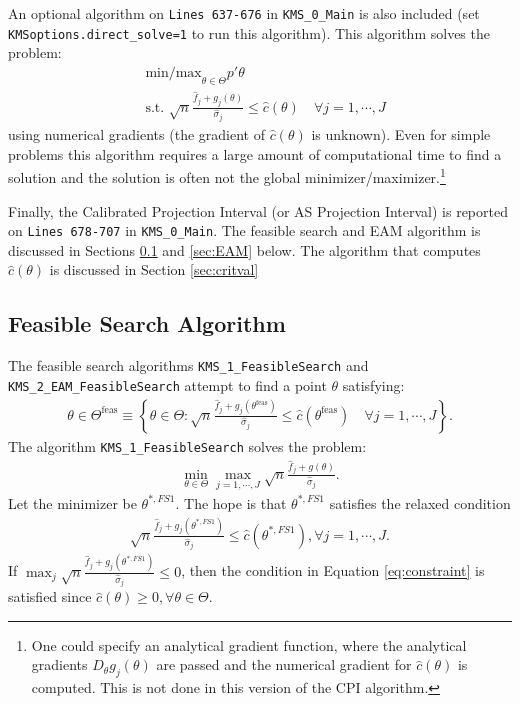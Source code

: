 \documentclass[12pt]{article}
\def\code#1{\texttt{#1}}
\begin{document}
An optional algorithm on \code{Lines 637-676} in \code{KMS\_0\_Main} is also included  (set \\ \code{KMSoptions.direct\_solve=1} to run this algorithm).  This algorithm solves the problem:
\begin{align*}
& \text{min/max}_{\theta \in \Theta} p'\theta \\
& \text{s.t. } \sqrt{n} \frac{\hat f_j + g_j(\theta)}{\hat \sigma_j} \leq \hat c(\theta) \quad \forall j=1,\cdots,J
\end{align*}
using numerical gradients (the gradient of $\hat c(\theta)$ is unknown).  Even for simple problems this algorithm requires a large amount of computational time to find a solution and the solution is often not the global minimizer/maximizer.\footnote{One could specify an analytical gradient function, where the analytical gradients $D_{\theta}g_j(\theta)$ are passed and the numerical gradient for $\hat c(\theta)$ is computed.  This is not done in this version of the CPI algorithm.}

Finally, the Calibrated Projection Interval (or AS Projection Interval) is reported on \code{Lines 678-707} in \code{KMS\_0\_Main}.  The feasible search and EAM algorithm is discussed in Sections \ref{sec:feassearch} and \ref{sec:EAM} below. The algorithm that computes $\hat c(\theta)$ is discussed in Section \ref{sec:critval}

\subsection{Feasible Search Algorithm}\label{sec:feassearch}
The feasible search algorithms \code{KMS\_1\_FeasibleSearch} and \code{KMS\_2\_EAM\_FeasibleSearch}  attempt to find a point $\theta$ satisfying:
\begin{align}\label{eq:feas}
\theta \in \Theta^{\text{feas}} \equiv \left\{ \theta \in \Theta : \sqrt{n} \frac{\hat f_j + g_j(\theta^{\text{feas}})}{\hat \sigma_j} \leq \hat c(\theta^{\text{feas}}) \quad \forall j=1,\cdots,J\right\}.
\end{align}
The algorithm \code{KMS\_1\_FeasibleSearch} solves the problem:
\begin{align}\label{eq:feas1}
\min_{\theta \in \Theta} \max_{j=1,\cdots,J}\sqrt{n} \frac{\hat f_j + g(\theta)}{\hat \sigma_j}.
\end{align}
Let the minimizer be $\theta^{*,FS1}$.  The hope is that $\theta^{*,FS1}$  satisfies the relaxed condition
\begin{align}\label{eq:constraint}
\sqrt{n} \frac{\hat f_j + g_j(\theta^{*,FS1})}{\hat \sigma_j} \leq \hat c(\theta^{*,FS1}), \forall j=1,\cdots,J.
\end{align} If $\max_j \sqrt{n} \frac{\hat f_j + g_j(\theta^{*,FS1})}{\hat \sigma_j} \leq 0$, then the condition in Equation \eqref{eq:constraint} is satisfied since $\hat c(\theta) \geq 0, \forall \theta \in \Theta$.
\end{document}

